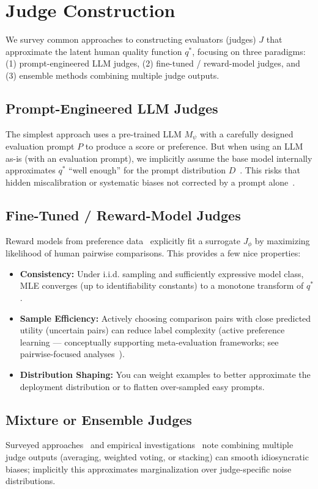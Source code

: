 \section{Judge Construction} 
We survey common approaches to constructing evaluators (judges) $J$ that approximate the latent human quality function $q^{*}$, focusing on three paradigms: (1) prompt-engineered LLM judges, (2) fine-tuned / reward-model judges, and (3) ensemble methods combining multiple judge outputs.

\subsection{Prompt-Engineered LLM Judges}
The simplest approach uses a pre-trained LLM $M_{\psi}$ with a carefully designed evaluation prompt $P$ to produce a score or preference. But when using an LLM as-is (with an evaluation prompt), we implicitly assume the base model internally approximates $q^{*}$ “well enough” for the prompt distribution $D$~\cite{li2024_llmsasjudges, fu2023gptscore}. This risks that hidden miscalibration or systematic biases not corrected by a prompt alone~\cite{bavaresco2024judgebench, hada2024metal}.

\subsection{Fine-Tuned / Reward-Model Judges}
Reward models from preference data~\cite{stiennon2020learning, ouyang2022training} explicitly fit a surrogate $J_{\phi}$ by maximizing likelihood of human pairwise comparisons. This provides a few nice properties:
\begin{itemize}
	\item \textbf{Consistency:} Under i.i.d. sampling and sufficiently expressive model class, MLE converges (up to identifiability constants) to a monotone transform of $q^{*}$.
	\item \textbf{Sample Efficiency:} Actively choosing comparison pairs with close predicted utility (uncertain pairs) can reduce label complexity (active preference learning — conceptually supporting meta-evaluation frameworks; see pairwise-focused analyses~\cite{liu2024pairs}).
	\item \textbf{Distribution Shaping:} You can weight examples to better approximate the deployment distribution or to flatten over-sampled easy prompts.
\end{itemize}

\subsection{Mixture or Ensemble Judges}
Surveyed approaches~\cite{li2024_llmsasjudges} and empirical investigations~\cite{bavaresco2024judgebench} note combining multiple judge outputs (averaging, weighted voting, or stacking) can smooth idiosyncratic biases; implicitly this approximates marginalization over judge-specific noise distributions.